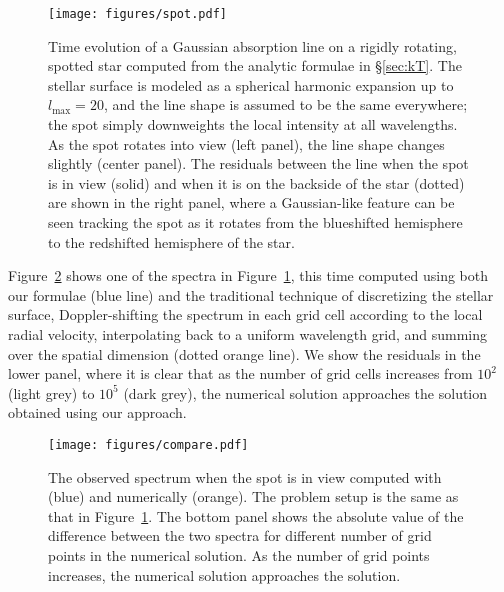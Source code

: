 \documentclass[modern]{aastex631}
\begin{document}
\begin{figure}[p!]
    \begin{centering}
        \texttt{[image: figures/spot.pdf]}
        \caption{%
            Time evolution of a Gaussian absorption line on a rigidly rotating, spotted star computed from the analytic formulae in \S\ref{sec:kT}.
            The stellar surface is modeled as a spherical harmonic expansion up to $l_\mathrm{max}=20$, and the line shape is assumed to be the same everywhere;
            the spot simply downweights the local intensity at all wavelengths.
            As the spot rotates into view (left panel), the line shape changes slightly (center panel). 
            The residuals between the line when the spot is in view (solid) and when it is on the backside of the star (dotted) are shown in the right panel, where a Gaussian-like feature can be seen tracking the spot as it rotates from the blueshifted hemisphere to the redshifted hemisphere of the star.
        }
        \label{fig:spot}
    \end{centering}
\end{figure}

Figure~\ref{fig:compare} shows one of the spectra in Figure~\ref{fig:spot}, this time computed using both our formulae (blue line) and the traditional technique of discretizing the stellar surface, Doppler-shifting the spectrum in each grid cell according to the local radial velocity, interpolating back to a uniform wavelength grid, and summing over the spatial dimension (dotted orange line). 
We show the residuals in the lower panel, where it is clear that as the number of grid cells increases from $10^2$ (light grey) to $10^5$ (dark grey), the numerical solution approaches the solution obtained using our approach.


\begin{figure}[t!]
    \begin{centering}
        \texttt{[image: figures/compare.pdf]}
        \caption{%
            The observed spectrum when the spot is in view computed with
            \starry (blue) and numerically (orange). 
            The problem setup is the same as that in Figure~\ref{fig:spot}. 
            The bottom panel shows the absolute value of the difference between the two spectra for different number of grid points in the numerical solution.
            As the number of grid points increases, the numerical solution approaches the \starry solution.
        }
        \label{fig:compare}
    \end{centering}
\end{figure}
\end{document}
